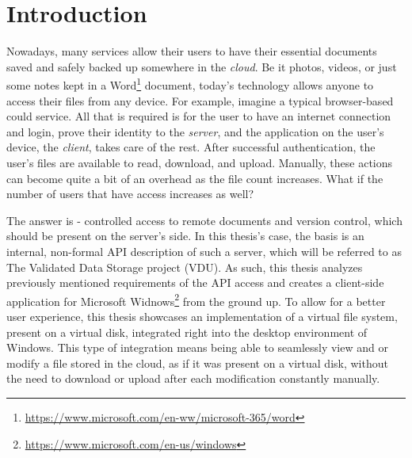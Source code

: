 
\chapter{Introduction}
\label{ch1}

Nowadays, many services allow their users to have their essential documents saved and safely backed up somewhere in the \textit{cloud}. Be it photos, videos, or just some notes kept in a Word\footnote{\url{https://www.microsoft.com/en-ww/microsoft-365/word}} document, today's technology allows anyone to access their files from any device. For example, imagine a typical browser-based could service. All that is required is for the user to have an internet connection and login, prove their identity to the \textit{server}, and the application on the user's device, the \textit{client}, takes care of the rest. After successful authentication, the user's files are available to read, download, and upload. Manually, these actions can become quite a bit of an overhead as the file count increases. What if the number of users that have access increases as well? 

The answer is - controlled access to remote documents and version control, which should be present on the server's side. In this thesis's case, the basis is an internal, non-formal API description of such a server, which will be referred to as The Validated Data Storage project (VDU). As such, this thesis analyzes previously mentioned requirements of the API access and creates a client-side application for Microsoft Widnows\footnote{\url{https://www.microsoft.com/en-us/windows}} from the ground up. To allow for a better user experience, this thesis showcases an implementation of a virtual file system, present on a virtual disk, integrated right into the desktop environment of Windows. This type of integration means being able to seamlessly view and or modify a file stored in the cloud, as if it was present on a virtual disk, without the need to download or upload after each modification constantly manually. 


